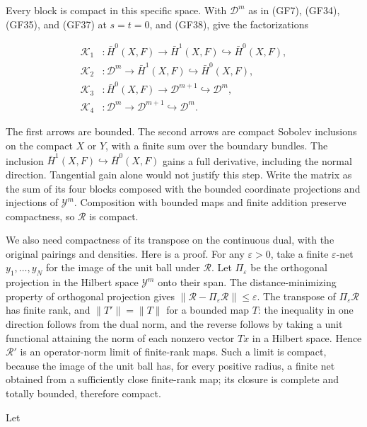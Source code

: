 \documentclass[
  11pt,
]{article}
\begin{document}
Every block is compact in this specific space. With \(\mathcal D^m\) as
in (GF7), (GF34), (GF35), and (GF37) at \(s=t=0\), and (GF38), give the
factorizations

\[
 \begin{aligned}
 \mathscr K_1&:\bar H^0(X,F)\longrightarrow
       \bar H^1(X,F)\hookrightarrow\bar H^0(X,F),\\
 \mathscr K_2&:\mathcal D^m\longrightarrow
       \bar H^1(X,F)\hookrightarrow\bar H^0(X,F),\\
 \mathscr K_3&:\bar H^0(X,F)\longrightarrow
       \mathcal D^{m+1}\hookrightarrow\mathcal D^m,\\
 \mathscr K_4&:\mathcal D^m\longrightarrow
       \mathcal D^{m+1}\hookrightarrow\mathcal D^m.
 \end{aligned}
 \tag{GF54M}
\]

The first arrows are bounded. The second arrows are compact Sobolev
inclusions on the compact \(X\) or \(Y\), with a finite sum over the
boundary bundles. The inclusion
\(\bar H^1(X,F)\hookrightarrow\bar H^0(X,F)\) gains a full derivative,
including the normal direction. Tangential gain alone would not justify
this step. Write the matrix as the sum of its four blocks composed with
the bounded coordinate projections and injections of \(\mathcal Y^m\).
Composition with bounded maps and finite addition preserve compactness,
so \(\mathscr R\) is compact.

We also need compactness of its transpose on the continuous dual, with
the original pairings and densities. Here is a proof. For any
\(\varepsilon>0\), take a finite \(\varepsilon\)-net \(y_1,\ldots,y_N\)
for the image of the unit ball under \(\mathscr R\). Let
\(\Pi_\varepsilon\) be the orthogonal projection in the Hilbert space
\(\mathcal Y^m\) onto their span. The distance-minimizing property of
orthogonal projection gives
\(\|\mathscr R-\Pi_\varepsilon\mathscr R\|\leq\varepsilon\). The
transpose of \(\Pi_\varepsilon\mathscr R\) has finite rank, and
\(\|T'\|=\|T\|\) for a bounded map \(T\): the inequality in one
direction follows from the dual norm, and the reverse follows by taking
a unit functional attaining the norm of each nonzero vector \(Tx\) in a
Hilbert space. Hence \(\mathscr R'\) is an operator-norm limit of
finite-rank maps. Such a limit is compact, because the image of the unit
ball has, for every positive radius, a finite net obtained from a
sufficiently close finite-rank map; its closure is complete and totally
bounded, therefore compact.

Let
\end{document}

